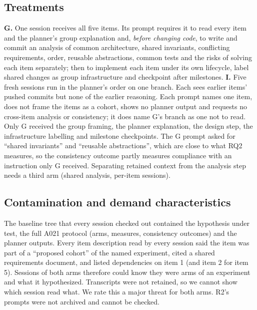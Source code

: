 \documentclass[10pt,conference]{IEEEtran}
\newcommand{\G}{G}
\newcommand{\I}{I}
\begin{document}
\subsection{Treatments}\label{sec:design-treatments}
\textbf{\G.} One session receives all five items. Its prompt requires it to read every item and the planner's group explanation and, \emph{before changing code}, to write and commit an analysis of common architecture, shared invariants, conflicting requirements, order, reusable abstractions, common tests and the risks of solving each item separately; then to implement each item under its own lifecycle, label shared changes as group infrastructure and checkpoint after milestones. \textbf{\I.} Five fresh sessions run in the planner's order on one branch. Each sees earlier items' pushed commits but none of the earlier reasoning. Each prompt names one item, does not frame the items as a cohort, shows no planner output and requests no cross-item analysis or consistency; it does name \G's branch as one not to read. %
Only \G{} received the group framing, the planner explanation, the design step, the infrastructure labelling and milestone checkpoints. The \G{} prompt asked for ``shared invariants'' and ``reusable abstractions'', which are close to what RQ2 measures, so the consistency outcome partly measures compliance with an instruction only \G{} received. %
Separating retained context from the analysis step needs a third arm (shared analysis, per-item sessions).

\subsection{Contamination and demand characteristics}\label{sec:design-leak}
The baseline tree that every session checked out contained the hypothesis under test, the full A021 protocol (arms, measures, consistency outcomes) and the planner outputs. Every item description read by every session said the item was part of a ``proposed cohort'' of the named experiment, cited a shared requirements document, and listed dependencies on item 1 (and item 2 for item 5). Sessions of both arms therefore could know they were arms of an experiment and what it hypothesized. Transcripts were not retained, so we cannot show which session read what. We rate this a major threat for both arms. R2's prompts were not archived and cannot be checked. %
\end{document}
